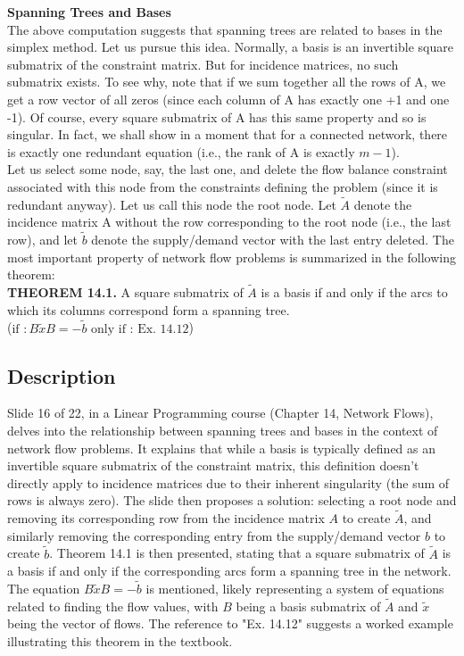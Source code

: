 \documentclass{article}%
\begin{document}
\textbf{Spanning Trees and Bases} \\
The above computation suggests that spanning trees are related to bases in the simplex method. Let us pursue this idea. Normally, a basis is an invertible square submatrix of the constraint matrix. But for incidence matrices, no such submatrix exists. To see why, note that if we sum together all the rows of A, we get a row vector of all zeros (since each column of A has exactly one +1 and one -1). Of course, every square submatrix of A has this same property and so is singular. In fact, we shall show in a moment that for a connected network, there is exactly one redundant equation (i.e., the rank of A is exactly $m - 1$). \\
Let us select some node, say, the last one, and delete the flow balance constraint associated with this node from the constraints defining the problem (since it is redundant anyway). Let us call this node the root node. Let $\tilde{A}$ denote the incidence matrix A without the row corresponding to the root node (i.e., the last row), and let $\tilde{b}$ denote the supply/demand vector with the last entry deleted. The most important property of network flow problems is summarized in the following theorem: \\
\textbf{THEOREM 14.1.} A square submatrix of $\tilde{A}$ is a basis if and only if the arcs to which its columns correspond form a spanning tree. \\
($\text{if } : B\tilde{x}B = -\tilde{b} \text{ only if : Ex. 14.12}$)
%
\subsection{Description}%
Slide 16 of 22, in a Linear Programming course (Chapter 14, Network Flows), delves into the relationship between spanning trees and bases in the context of network flow problems. It explains that while a basis is typically defined as an invertible square submatrix of the constraint matrix, this definition doesn't directly apply to incidence matrices due to their inherent singularity (the sum of rows is always zero).  The slide then proposes a solution: selecting a root node and removing its corresponding row from the incidence matrix $A$ to create $\tilde{A}$, and similarly removing the corresponding entry from the supply/demand vector $b$ to create $\tilde{b}$.  Theorem 14.1 is then presented, stating that a square submatrix of $\tilde{A}$ is a basis if and only if the corresponding arcs form a spanning tree in the network. The equation $B\tilde{x}B = -\tilde{b}$ is mentioned, likely representing a system of equations related to finding the flow values, with $B$ being a basis submatrix of $\tilde{A}$ and $\tilde{x}$ being the vector of flows.  The reference to "Ex. 14.12" suggests a worked example illustrating this theorem in the textbook.%
\end{document}
